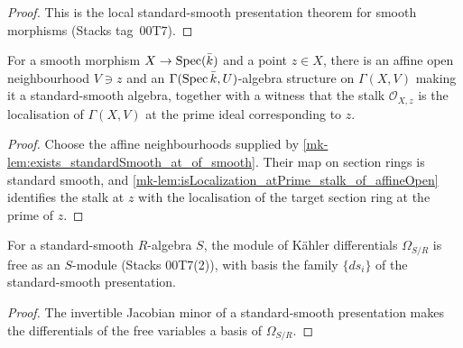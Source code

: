 \begin{proof}
  This is the local standard-smooth presentation theorem for smooth morphisms
  (Stacks tag~00T7).
\end{proof}

\begin{lemma}\label{mk-lem:exists_algebra_standardSmooth_stalk_localization}
  \leanok

  For a smooth morphism \(X \to \operatorname{Spec}(\bar k)\) and a point \(z \in X\), there is
  an affine open neighbourhood \(V \ni z\) and an \(\Gamma(\operatorname{Spec} \bar k, U)\)-algebra
  structure on \(\Gamma(X, V)\) making it a standard-smooth algebra, together with a
  witness that the stalk \(\mathcal O_{X, z}\) is the localisation of \(\Gamma(X, V)\)
  at the prime ideal corresponding to \(z\).
\end{lemma}

\begin{proof}
  Choose the affine neighbourhoods supplied by
  \ref{mk-lem:exists_standardSmooth_at_of_smooth}.  Their map on section rings is
  standard smooth, and
  \ref{mk-lem:isLocalization_atPrime_stalk_of_affineOpen} identifies the stalk at
  \(z\) with the localisation of the target section ring at the prime of \(z\).
\end{proof}

\begin{lemma}\label{mk-lem:module_free_kaehler_standardSmooth}
  \leanok

  For a standard-smooth \(R\)-algebra \(S\), the module of K\"ahler differentials
  \(\Omega_{S/R}\) is free as an \(S\)-module (Stacks 00T7(2)), with basis the family
  \(\{ds_i\}\) of the standard-smooth presentation.
\end{lemma}

\begin{proof}
  The invertible Jacobian minor of a standard-smooth presentation makes the
  differentials of the free variables a basis of \(\Omega_{S/R}\).
\end{proof}

